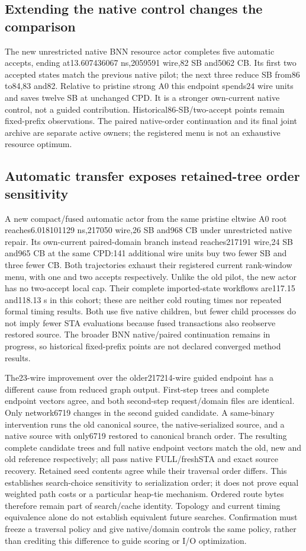 \documentclass[conference,10pt]{IEEEtran}
\begin{document}
\subsection{Extending the native control changes the comparison}
The new unrestricted native BNN resource actor completes five automatic accepts, ending at13.607436067 ns,2059591 wire,82 SB and5062 CB. Its first two accepted states match the previous native pilot; the next three reduce SB from86 to84,83 and82. Relative to pristine strong A0 this endpoint spends24 wire units and saves twelve SB at unchanged CPD. It is a stronger own-current native control, not a guided contribution. Historical86-SB/two-accept points remain fixed-prefix observations. The paired native-order continuation and its final joint archive are separate active owners; the registered menu is not an exhaustive resource optimum.

\subsection{Automatic transfer exposes retained-tree order sensitivity}
A new compact/fused automatic actor from the same pristine eltwise A0 root reaches6.018101129 ns,217050 wire,26 SB and968 CB under unrestricted native repair. Its own-current paired-domain branch instead reaches217191 wire,24 SB and965 CB at the same CPD:141 additional wire units buy two fewer SB and three fewer CB. Both trajectories exhaust their registered current rank-window menu, with one and two accepts respectively. Unlike the old pilot, the new actor has no two-accept local cap. Their complete imported-state workflows are117.15 and118.13 s in this cohort; these are neither cold routing times nor repeated formal timing results. Both use five native children, but fewer child processes do not imply fewer STA evaluations because fused transactions also reobserve restored source. The broader BNN native/paired continuation remains in progress, so historical fixed-prefix points are not declared converged method results.

The23-wire improvement over the older217214-wire guided endpoint has a different cause from reduced graph output. First-step trees and complete endpoint vectors agree, and both second-step request/domain files are identical. Only network6719 changes in the second guided candidate. A same-binary intervention runs the old canonical source, the native-serialized source, and a native source with only6719 restored to canonical branch order. The resulting complete candidate trees and full native endpoint vectors match the old, new and old reference respectively; all pass native FULL/freshSTA and exact source recovery. Retained seed contents agree while their traversal order differs. This establishes search-choice sensitivity to serialization order; it does not prove equal weighted path costs or a particular heap-tie mechanism. Ordered route bytes therefore remain part of search/cache identity. Topology and current timing equivalence alone do not establish equivalent future searches. Confirmation must freeze a traversal policy and give native/domain controls the same policy, rather than crediting this difference to guide scoring or I/O optimization.
\end{document}
